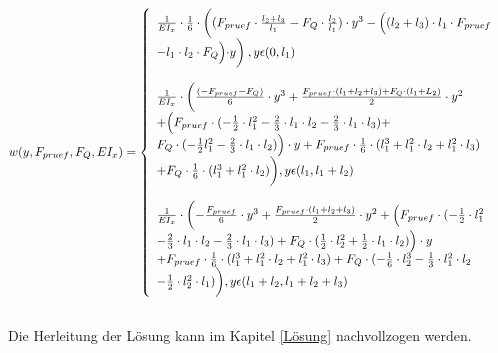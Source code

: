 \begin{equation}\label{eq:36}
	w(y,F_{pruef},F_{Q},EI_{x})=\left\{\begin{array}{ll}
		\frac{1}{EI_{x}}\cdot\frac{1}{6}\cdot\biggl((F_{pruef}\cdot \frac{l_{2}+l_{3}}{l_{1}}-F_{Q}\cdot \frac{l_{2}}{l_{1}})\cdot y^{3}-\Bigl((l_{2}+l_{3})\cdot l_{1}\cdot F_{pruef}\\-l_{1}\cdot l_{2}\cdot F_{Q}\Bigl)\cdot y \biggr)\:,y\epsilon (0,l_{1})&\\&\\
		\frac{1}{EI_{x}}\cdot\biggl(\frac{(-F_{pruef}-F_{Q})}{6}\cdot y^{3} + \frac{F_{pruef}\cdot (l_{1}+l_{2}+l_{3})+F_{Q}\cdot (l_{1}+L_{2})}{2}\cdot y^{2}\\ + \Bigl(F_{pruef}\cdot(-\frac{1}{2}\cdot l_{1}^{2}-\frac{2}{3}\cdot l_{1}\cdot l_{2}-\frac{2}{3}\cdot l_{1}\cdot l_{3})+ \\F_{Q}\cdot(-\frac{1}{2}l_{1}^{2}-\frac{2}{3}\cdot l_{1}\cdot l_{2})\Bigr)\cdot y + F_{pruef}\cdot\frac{1}{6}\cdot(l_{1}^{3}+l_{1}^{2}\cdot l_{2}+l_{1}^{2}\cdot l_{3}) \\+ F_{Q}\cdot\frac{1}{6}\cdot(l_{1}^{3}+l_{1}^{2}\cdot l_{2})\biggr),y\epsilon (l_{1}, l_{1}+l_{2})&\\&\\
		\frac{1}{EI_{x}}\cdot\biggl(-\frac{F_{pruef}}{6}\cdot y^{3} + \frac{ F_{pruef}\cdot (l_{1}+l_{2}+l_{3})}{2}\cdot y^{2} + \Bigl(F_{pruef} 
		\cdot(-\frac{1}{2}\cdot l_{1}^{2} \\-\frac{2}{3}\cdot l_{1}\cdot l_{2}-\frac{2}{3}\cdot l_{1}\cdot l_{3}) + F_{Q}\cdot(\frac{1}{2}\cdot l_{2}^{2}+\frac{1}{2}\cdot l_{1}\cdot l_{2})\Bigr)\cdot y \\ +F_{pruef}\cdot\frac{1}{6}\cdot(l_{1}^{3}+l_{1}^{2}\cdot l_{2}+l_{1}^{2}\cdot l_{3}) + F_{Q}\cdot(-\frac{1}{6}\cdot l_{2}^{3}-\frac{1}{3}\cdot l_{1}^{2}\cdot l_{2}\\-\frac{1}{2}\cdot l_{2}^{2}\cdot l_{1})\biggr),y\epsilon (l_{1}+l_{2}, l_{1}+l_{2}+l_{3})&
	\end{array}\right.
\end{equation}\\
Die Herleitung der Lösung kann im Kapitel \ref{Lösung} nachvollzogen werden.\\


